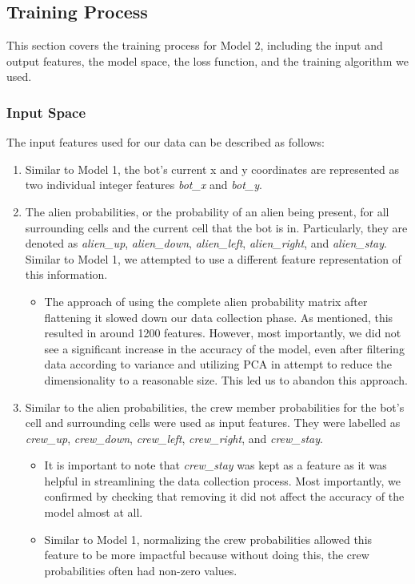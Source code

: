 \documentclass[11pt]{article}
\begin{document}
\subsection{Training Process}
This section covers the training process for Model 2, including the input and output features, the model space, the loss function, and the training algorithm we used.

\subsubsection{Input Space}
The input features used for our data can be described as follows: 
\begin{enumerate}
\item Similar to Model 1, the bot's current x and y coordinates are represented as two individual integer features \textit{bot\_x} and \textit{bot\_y}. 
\item The alien probabilities, or the probability of an alien being present, for all surrounding cells and the current cell that the bot is in. Particularly, they are denoted as \textit{alien\_up}, \textit{alien\_down}, \textit{alien\_left}, \textit{alien\_right}, and \textit{alien\_stay}. Similar to Model 1, we attempted to use a different feature representation of this information. 
\begin{itemize}
    \item The approach of using the complete alien probability matrix after flattening it slowed down our data collection phase. As mentioned, this resulted in around 1200 features. However, most importantly, we did not see a significant increase in the accuracy of the model, even after filtering data according to variance and utilizing PCA in attempt to reduce the dimensionality to a reasonable size. This led us to abandon this approach. 
\end{itemize}
\item Similar to the alien probabilities, the crew member probabilities for the bot's cell and surrounding cells were used as input features. They were labelled as \textit{crew\_up}, \textit{crew\_down}, \textit{crew\_left}, \textit{crew\_right}, and \textit{crew\_stay}. 
\begin{itemize}
    \item It is important to note that \textit{crew\_stay} was kept as a feature as it was helpful in streamlining the data collection process. Most importantly, we confirmed by checking that removing it did not affect the accuracy of the model almost at all. 
    \item Similar to Model 1, normalizing the crew probabilities allowed this feature to be more impactful because without doing this, the crew probabilities often had non-zero values.  

\end{itemize}
\end{enumerate}
\end{document}

